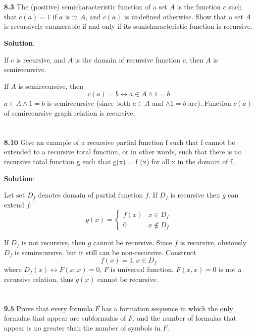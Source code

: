 \documentclass{ctexart}
\begin{document}
\section*{}
\textbf{8.3} The (positive) semicharacteristic function of a set $A$ is the function $c$ such
that $c(a) = 1$ if $a$ is in $A$, and $c(a)$ is undefined otherwise. Show that a set $A$ is
recursively enumerable if and only if its semicharacteristic function is recursive.

\textbf{Solution}:

If $c$ is recursive, and $A$ is the domain of recursive function $c$, then $A$ is semirecursive.

If $A$ is semirecursive, then
$$
c(a) = b \leftrightarrow a \in A \land 1 = b
$$
$a \in A \land 1 = b$ is semirecursive (since both $a \in A$ and $\land 1 = b$ are). Function $c(a)$
of semirecursive graph relation is recursive.

\section*{}
\textbf{8.10} Give an example of a recursive partial function f such that f
cannot be extended to a recursive total function, or in other words, such that there is no
recursive total function g such that g(x) = f (x) for all x in the domain of f.

\textbf{Solution}:

Let set $D_f$ denotes domain of partial function $f$. If $D_f$ is recursive
then $g$ can extend $f$:
$$
g(x) = \begin{cases}
	f(x) & x \in D_f \\
	0 & x \not\in D_f
\end{cases}
$$

If $D_f$ is not recursive, then $g$ cannot be recursive. Since $f$ is recursive,
obviously $D_f$ is semirecursive, but it still can be non-recursive. Construct
$$
f(x) = 1, x \in D_f
$$
where $D_f(x) \leftrightarrow F(x, x) = 0$, $F$ is universal function. $F(x, x) = 0$ is not a
recursive relation, thus $g(x)$ cannot be recursive.

\section*{}
\textbf{9.5} Prove that every formula $F$ has a formation sequence in which the only formulas
that appear are subformulas of $F$, and the number of formulas that appear is no greater than
the number of symbols in $F$.
\end{document}
